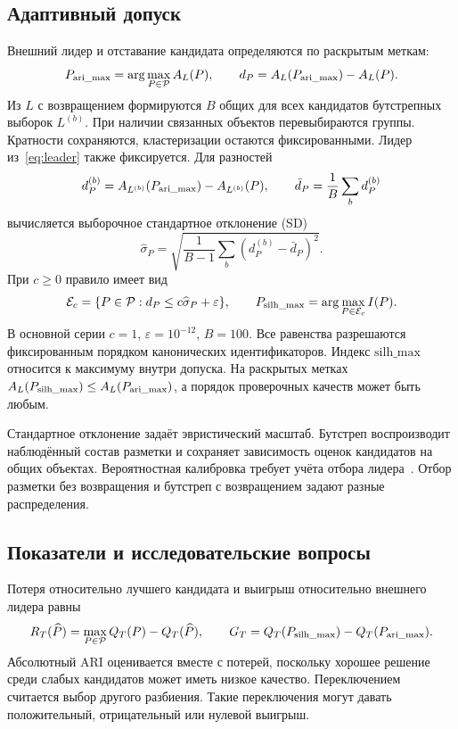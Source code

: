 \subsection{Адаптивный допуск}
Внешний лидер и отставание кандидата определяются по раскрытым меткам:
\begin{equation}\label{eq:leader}
 P_{\mathrm{ari\_max}}=\arg\max_{P\in\mathcal P}A_L(P),\qquad d_P=A_L(P_{\mathrm{ari\_max}})-A_L(P).
\end{equation}
Из $L$ с возвращением формируются $B$ общих для всех кандидатов бутстрепных выборок $L^{(b)}$. При наличии связанных объектов перевыбираются группы. Кратности сохраняются, кластеризации остаются фиксированными. Лидер из~\eqref{eq:leader} также фиксируется. Для разностей
\begin{equation}
 d_P^{(b)}=A_{L^{(b)}}(P_{\mathrm{ari\_max}})-A_{L^{(b)}}(P),\qquad
 \bar d_P=\frac1B\sum_b d_P^{(b)}
\end{equation}
вычисляется выборочное стандартное отклонение (SD)
\begin{equation}
 \widehat\sigma_P=\sqrt{\frac1{B-1}\sum_b(d_P^{(b)}-\bar d_P)^2}.
\end{equation}
При $c\ge0$ правило имеет вид
\begin{equation}\label{eq:adaptive}
 \mathcal E_c=\{P\in\mathcal P:d_P\le c\widehat\sigma_P+\varepsilon\},\qquad
 P_{\mathrm{silh\_max}}=\arg\max_{P\in\mathcal E_c}I(P).
\end{equation}
В основной серии $c=1$, $\varepsilon=10^{-12}$, $B=100$. Все равенства разрешаются фиксированным порядком канонических идентификаторов. Индекс $\mathrm{silh\_max}$ относится к максимуму внутри допуска. На раскрытых метках $A_L(P_{\mathrm{silh\_max}})\le A_L(P_{\mathrm{ari\_max}})$, а порядок проверочных качеств может быть любым.

Стандартное отклонение задаёт эвристический масштаб. Бутстреп воспроизводит наблюдённый состав разметки и сохраняет зависимость оценок кандидатов на общих объектах. Вероятностная калибровка требует учёта отбора лидера~\citep{efron2014}. Отбор разметки без возвращения и бутстреп с возвращением задают разные распределения.

\subsection{Показатели и исследовательские вопросы}
Потеря относительно лучшего кандидата и выигрыш относительно внешнего лидера равны
\begin{equation}\label{eq:regret-gain}
 R_T(\widehat P)=\max_{P\in\mathcal P}Q_T(P)-Q_T(\widehat P),\qquad
 G_T=Q_T(P_{\mathrm{silh\_max}})-Q_T(P_{\mathrm{ari\_max}}).
\end{equation}
Абсолютный ARI оценивается вместе с потерей, поскольку хорошее решение среди слабых кандидатов может иметь низкое качество. Переключением считается выбор другого разбиения. Такие переключения могут давать положительный, отрицательный или нулевой выигрыш.

